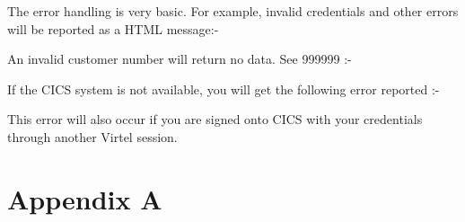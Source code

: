 \documentclass[letterpaper,10pt,english]{sphinxmanual}
\begin{document}

The error handling is very basic. For example, invalid credentials and other errors will be reported as a HTML message:-


An invalid customer number will return no data. See 999999 :-


If the CICS system is not available, you will get the following error reported :-


This error will also occur if you are signed onto CICS with your credentials through another Virtel session.


\chapter{Appendix A}
\label{\detokenize{TN202001:appendix-a}}
\end{document}

